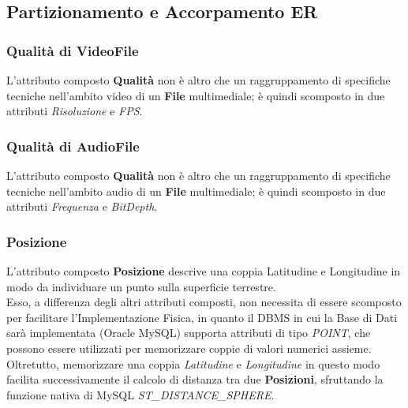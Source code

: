 \documentclass{article}
\begin{document}
\subsection{Partizionamento e Accorpamento ER}
\subsubsection{Qualità di VideoFile}
L'attributo composto \textbf{Qualità} non è altro che un raggruppamento di specifiche tecniche nell'ambito video di un \textbf{File} multimediale; è quindi scomposto in due attributi \textit{Risoluzione} e \textit{FPS}. 
\subsubsection{Qualità di AudioFile}
L'attributo composto \textbf{Qualità} non è altro che un raggruppamento di specifiche tecniche nell'ambito audio di un \textbf{File} multimediale; è quindi scomposto in due attributi \textit{Frequenza} e \textit{BitDepth}. 
\subsubsection{Posizione}
L'attributo composto \textbf{Posizione} descrive una coppia Latitudine e Longitudine in modo da individuare un punto sulla superficie terrestre.
\\
Esso, a differenza degli altri attributi composti, non necessita di essere scomposto per facilitare l'Implementazione Fisica, in quanto il DBMS in cui la Base di Dati sarà implementata (Oracle MySQL) supporta attributi di tipo \textit{POINT}, che possono essere utilizzati per memorizzare coppie di valori numerici assieme.
\\
Oltretutto, memorizzare una coppia \textit{Latitudine} e \textit{Longitudine} in questo modo facilita successivamente il calcolo di distanza tra due \textbf{Posizioni}, sfruttando la funzione nativa di MySQL \textit{ST\_DISTANCE\_SPHERE}.
\\
\end{document}
